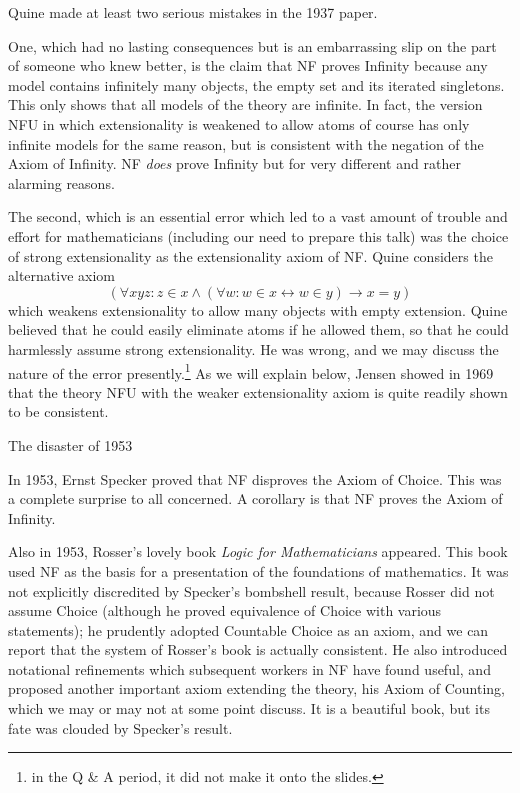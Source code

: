 \documentclass{slides}
\begin{document}
\begin{slide}

Quine made at least two serious mistakes in the 1937 paper.

One, which had no lasting consequences but is an embarrassing slip on the part of someone who knew better, is the claim that NF proves Infinity because any model contains infinitely many objects, the empty set  and its iterated singletons.  This only shows that all models of the theory are infinite.  In fact, the version NFU in which extensionality is weakened to allow atoms of course has only infinite models for the same reason, but is consistent with the negation of the Axiom of Infinity.  NF {\em does\/} prove Infinity but for very different and rather alarming reasons.

\end{slide}

\begin{slide}

The second, which is an essential error which led to a vast amount of trouble and effort for mathematicians (including our need to prepare this talk) was the choice of strong extensionality as the extensionality axiom of NF.
Quine considers the alternative axiom $$(\forall xyz:z \in x \wedge (\forall w:w \in x \leftrightarrow w \in y) \rightarrow x=y)$$ which weakens extensionality to allow many objects with empty extension.  Quine believed that he could easily eliminate atoms if he allowed them, so that he could harmlessly assume strong extensionality.  He was wrong, and we may discuss the nature of the error presently.\footnote{ in the Q \& A period, it did not make it onto the slides.}  As we will explain below, Jensen showed in 1969 that the theory NFU with the weaker extensionality axiom is quite readily shown to be consistent.

\end{slide}

\begin{slide}

The disaster of 1953

In 1953, Ernst Specker proved that NF disproves the Axiom of Choice.  This was a complete surprise to all concerned.  A corollary is that NF proves the Axiom of Infinity.

Also in 1953, Rosser's lovely book {\em Logic for Mathematicians\/} appeared.  This book used NF as the basis for a presentation of the foundations of mathematics.  It was not explicitly discredited by
Specker's bombshell result, because Rosser did not assume Choice (although he proved equivalence of Choice with various statements);  he prudently adopted Countable Choice as an axiom, and we can report that the system of Rosser's book is actually consistent.  He also introduced notational refinements which subsequent workers in NF have found useful, and proposed another important axiom extending the theory, his Axiom of Counting, which we may or may not at some point discuss.  It is a beautiful book, but its fate was clouded by Specker's result.


\end{slide}
\end{document}
